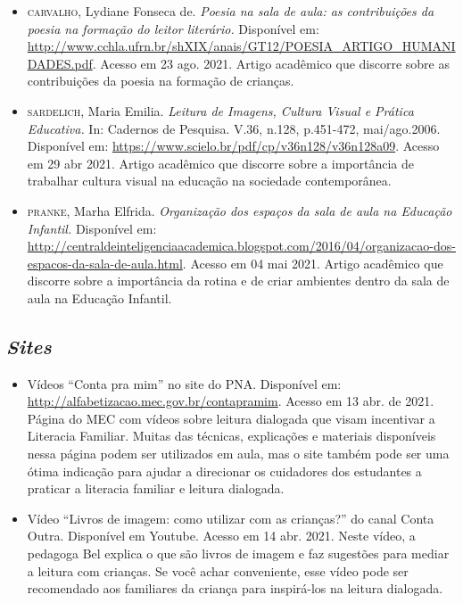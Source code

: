 \documentclass[11pt]{extarticle}
\begin{document}
\begin{itemize}

	\item \textsc{carvalho}, Lydiane Fonseca de. \emph{Poesia na sala de aula: as contribuições da poesia na formação
	do leitor literário.} Disponível em: \url{http://www.cchla.ufrn.br/shXIX/anais/GT12/POESIA_ARTIGO_HUMANIDADES.pdf}. Acesso em 23 ago. 2021.
	Artigo acadêmico que discorre sobre as contribuições da poesia na formação de crianças.
	\item \textsc{sardelich}, Maria Emilia. \emph{Leitura de Imagens, Cultura Visual e Prática Educativa.} 
In: Cadernos de Pesquisa. V.36, n.128, p.451-472, mai/ago.2006. Disponível em: \url{https://www.scielo.br/pdf/cp/v36n128/v36n128a09}. 
Acesso em 29 abr 2021. 
Artigo acadêmico que discorre sobre a importância de trabalhar cultura 
visual na educação na sociedade contemporânea. 

\item \textsc{pranke}, Marha Elfrida. \emph{Organização dos espaços da sala de aula na Educação Infantil.} Disponível em: 
\url{http://centraldeinteligenciaacademica.blogspot.com/2016/04/organizacao-dos-espacos-da-sala-de-aula.html}. Acesso em 04 mai 2021. 
Artigo acadêmico que discorre sobre a importância da rotina e de criar ambientes dentro da sala de aula na Educação Infantil.  
\end{itemize}

\subsection{\textit{Sites}}

\begin{itemize}
\item Vídeos “Conta pra mim” no site do PNA. Disponível em: \url{http://alfabetizacao.mec.gov.br/contapramim}. 
Acesso em 13 abr. de 2021.
Página do MEC com vídeos sobre leitura dialogada que visam incentivar a Literacia Familiar. Muitas das 
técnicas, explicações e materiais disponíveis nessa página podem ser utilizados em aula, mas o site também 
pode ser uma ótima indicação para ajudar a direcionar os cuidadores dos estudantes a praticar 
a literacia familiar e leitura dialogada.

\item Vídeo “Livros de imagem: como utilizar com as crianças?” do canal Conta Outra. Disponível em Youtube. 
Acesso em 14 abr. 2021. 
Neste vídeo, a pedagoga Bel explica o que são livros de imagem e faz sugestões para mediar a leitura com 
crianças. Se você achar conveniente, esse vídeo pode ser recomendado aos familiares da criança 
para inspirá-los na leitura dialogada. 

\end{itemize}
\end{document}
